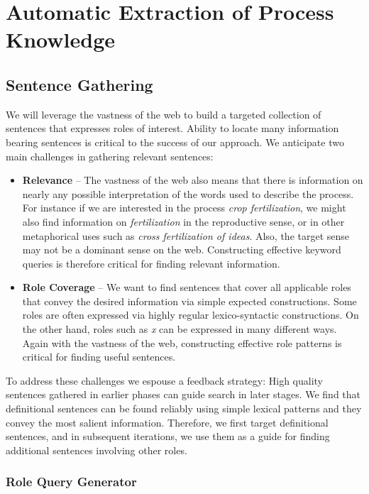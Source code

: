 \section{Automatic Extraction of Process Knowledge} 

\subsection{Sentence Gathering}

We will leverage the vastness of the web to build a targeted collection of sentences that expresses roles of interest.
Ability to locate many information bearing sentences is critical to the success of our approach.
We anticipate two main challenges in gathering relevant sentences:
\begin{itemize}
\item {\bf Relevance} -- The vastness of the web also means that there is information on nearly any possible interpretation of the words used to describe the process. 
For instance if we are interested in the process {\em crop fertilization}, we might also find information on {\em fertilization} in the reproductive sense, 
or in other metaphorical uses such as {\em cross fertilization of ideas}. Also, the target sense may not be a dominant sense on the web. 
Constructing effective keyword queries is therefore critical for finding relevant information.
\item {\bf Role Coverage} -- We want to find sentences that cover all applicable roles that convey the desired information via simple expected constructions.
Some roles are often expressed via highly regular lexico-syntactic constructions. 
On the other hand, roles such as {\em x} can be expressed in many different ways. 
Again with the vastness of the web, constructing effective role patterns is critical for finding useful sentences. 
\end{itemize}
To address these challenges we espouse a feedback strategy:
High quality sentences gathered in earlier phases can guide search in later stages. 
We find that definitional sentences can be found reliably using simple lexical patterns and they convey the most salient information. 
Therefore, we first target definitional sentences, and in subsequent iterations, we use them as a guide for finding additional sentences involving other roles.

\subsubsection{Role Query Generator}

